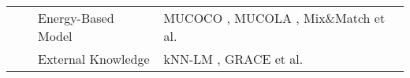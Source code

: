 \begin{table}[htbp]
\begin{tabular}{p{}p{}p{}p{}}
                                          &                                             & Energy-Based Model       & MUCOCO \cite{kumar_nips21_MUCOCO}, MUCOLA \cite{kumar_emnlp22_MUCOLA}, Mix\&Match \cite{mireshghallah_acl22_mixandmatch} et al.                               \\ \cline{3-4} 
                                          &                                             & External Knowledge       & kNN-LM \cite{Khandelwal_iclr20_kNN-LM}, GRACE \cite{wen_acl23_GRACE} et al.                                  \\ \hline
\end{tabular}
\end{table}